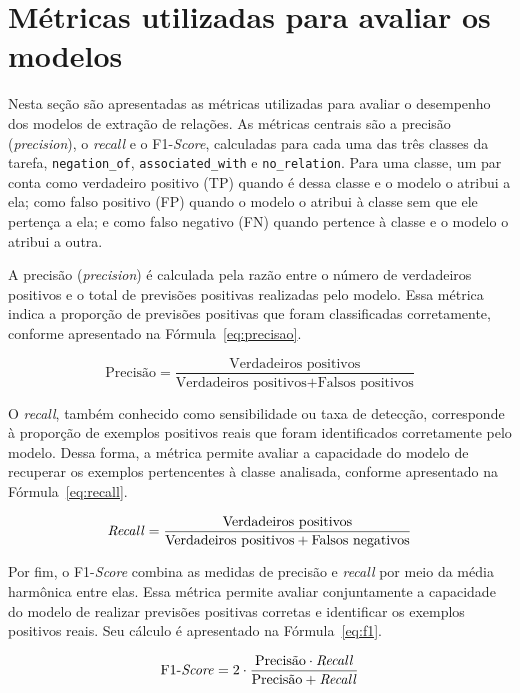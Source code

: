 \section{Métricas utilizadas para avaliar os modelos}
\label{sec:metricas}

Nesta seção são apresentadas as métricas utilizadas para avaliar o desempenho dos
modelos de extração de relações. As métricas centrais são a precisão
(\emph{precision}), o \emph{recall} e o F1-\emph{Score}, calculadas para cada uma das
três classes da tarefa, \texttt{negation\_of}, \texttt{associated\_with} e
\texttt{no\_relation}. Para uma classe, um par conta como verdadeiro positivo (TP)
quando é dessa classe e o modelo o atribui a ela; como falso positivo (FP) quando o
modelo o atribui à classe sem que ele pertença a ela; e como falso negativo (FN)
quando pertence à classe e o modelo o atribui a outra.

A precisão (\emph{precision}) é calculada pela razão entre o número de verdadeiros
positivos e o total de previsões positivas realizadas pelo modelo. Essa métrica indica
a proporção de previsões positivas que foram classificadas corretamente, conforme
apresentado na Fórmula~\ref{eq:precisao}.

\[
  \text{Precisão} =
  \frac{\text{Verdadeiros positivos}}
       {\text{Verdadeiros positivos} + \text{Falsos positivos}}
\]

O \emph{recall}, também conhecido como sensibilidade ou taxa de detecção, corresponde
à proporção de exemplos positivos reais que foram identificados corretamente pelo
modelo. Dessa forma, a métrica permite avaliar a capacidade do modelo de recuperar os
exemplos pertencentes à classe analisada, conforme apresentado na
Fórmula~\ref{eq:recall}.

\[
  \text{\emph{Recall}} =
  \frac{\text{Verdadeiros positivos}}
       {\text{Verdadeiros positivos} + \text{Falsos negativos}}
\]

Por fim, o F1-\emph{Score} combina as medidas de precisão e \emph{recall} por meio da
média harmônica entre elas. Essa métrica permite avaliar conjuntamente a capacidade do
modelo de realizar previsões positivas corretas e identificar os exemplos positivos
reais. Seu cálculo é apresentado na Fórmula~\ref{eq:f1}.

\[
  \text{F1-\emph{Score}} =
  2 \cdot \frac{\text{Precisão} \cdot \text{\emph{Recall}}}
               {\text{Precisão} + \text{\emph{Recall}}}
\]

